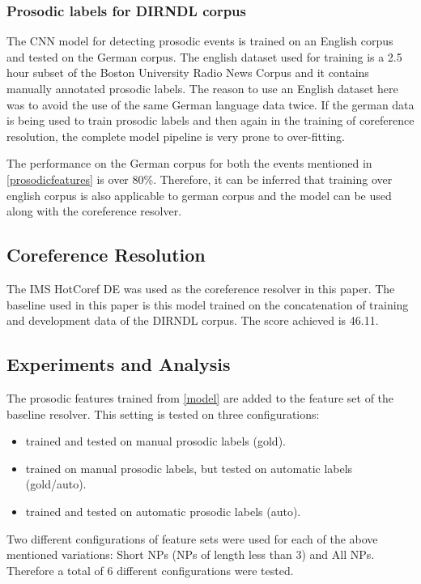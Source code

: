 \documentclass[a4paper]{article}
\begin{document}
\subsubsection{Prosodic labels for DIRNDL corpus}
The CNN model for detecting prosodic events is trained on an English corpus and tested on the German corpus. The english dataset used for training is a 2.5 hour subset of the Boston University Radio News Corpus and it contains manually annotated prosodic labels. The reason to use an English dataset here was to avoid the use of the same German language data twice. If the german data is being used to train prosodic labels and then again in the training of coreference resolution, the complete model pipeline is very prone to over-fitting.

The performance on the German corpus for both the events mentioned in \ref{prosodicfeatures} is over 80\%. Therefore, it can be inferred that training over english corpus is also applicable to german corpus and the model can be used along with the coreference resolver.

\subsection{Coreference Resolution}
The IMS HotCoref DE was used as the coreference resolver in this paper. The baseline used in this paper is this model trained on the concatenation of training and development data of the DIRNDL corpus. The score achieved is 46.11.

\subsection{Experiments and Analysis}
The prosodic features trained from \ref{model} are added to the feature set of the baseline resolver. This setting is tested on three configurations:

\begin{itemize}
  \item trained and tested on manual prosodic labels (gold).
  \item trained on manual prosodic labels, but tested on automatic labels (gold/auto).
  \item trained and tested on automatic prosodic labels (auto).
\end{itemize}

Two different configurations of feature sets were used for each of the above mentioned variations: Short NPs (NPs of length less than 3) and All NPs. Therefore a total of 6 different configurations were tested.
\end{document}

